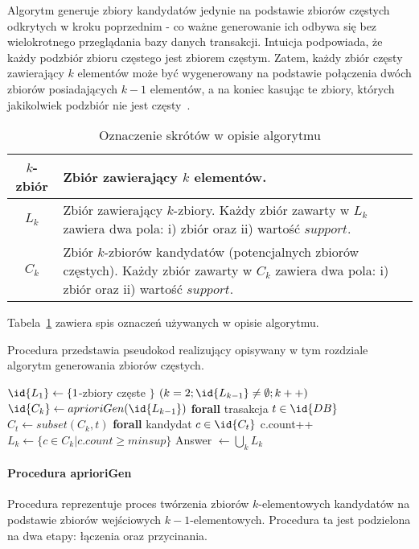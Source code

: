 Algorytm generuje zbiory kandydatów jedynie na podstawie zbiorów częstych odkrytych w kroku poprzednim - co ważne generowanie ich odbywa się bez wielokrotnego przeglądania bazy danych transakcji. Intuicja podpowiada, że każdy podzbiór zbioru częstego jest zbiorem częstym. Zatem, każdy zbiór częsty zawierający $k$ elementów może być wygenerowany na podstawie połączenia dwóch zbiorów posiadających $k-1$ elementów, a na koniec kasując te zbiory, których jakikolwiek podzbiór nie jest częsty~\cite{Apriori:Main}.

\begin{table}
	\centering
	\begin{tabular}{|c|p{7.7cm}|} \hline
	$k$-zbiór & Zbiór zawierający $k$ elementów. \\ \hline
	$L_k$ & Zbiór zawierający $k$-zbiory. Każdy zbiór zawarty w $L_k$ zawiera dwa pola: i) zbiór oraz ii) wartość $support$. \\ \hline
	$C_k$ & Zbiór $k$-zbiorów kandydatów (potencjalnych zbiorów częstych). Każdy zbiór zawarty w $C_k$ zawiera dwa pola: i) zbiór oraz ii) wartość $support$. \\ \hline
	\end{tabular}\label{skroty:znaczanie}
	\caption{Oznaczenie skrótów w opisie algorytmu}
\end{table}

Tabela~\ref{skroty:znaczanie} zawiera spis oznaczeń używanych w opisie algorytmu. 

Procedura  przedstawia pseudokod realizujący opisywany w tym rozdziale algorytm generowania zbiorów częstych.

\begin{codebox}
	\label{apriori:listing}
	\li $\id{L_1} \gets \lbrace 1$-zbiory częste $\rbrace$
		\li \For $(k = 2; \id{L_{k-1}} \neq \emptyset; k++)$
		\li \Do
			\li $\id{C_k} \gets aprioriGen(\id{L_{k-1}})$
			\li \textbf{forall} trasakcja $t \in \id{DB}$
			\li \Do
					\li $C_t \gets subset(C_k, t)$
					\li \textbf{forall} kandydat $c \in \id{C_t}$
					\li \Do c.count++
					\End
				\End
			\li $L_k \gets \lbrace c \in C_k | c.count \geq minsup \rbrace$	
		\End
	\li Answer $\gets \bigcup_k L_k $
\end{codebox}

\paragraph{Procedura aprioriGen}
Procedura  reprezentuje proces twórzenia zbiorów $k$-elementowych kandydatów na podstawie zbiorów wejściowych ${k-1}$-elementowych. Procedura ta jest podzielona na dwa etapy: łączenia oraz przycinania. 

